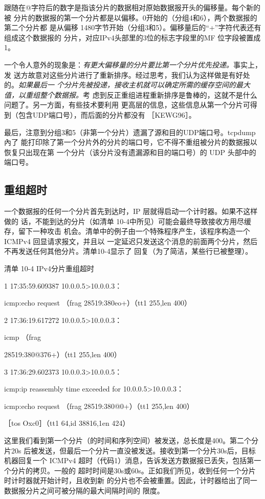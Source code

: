 跟随在@字符后的数字是指该分片的数据相对原始数据报开头的偏移量。每个新的被
分片的数据报的第一个分片都是以偏移。0开始的（分组4和6），两个数据报的第二个分片都
是从偏移 1480字节开始（分组3和5）。偏移量后的“+”字符代表还有组成这个数据报的
分片，对应IPv4头部里的3位的标志字段里的MF 位字段被置成1。

一个令人意外的现象是：\emph{有更大偏移量的分片要比第一个分片优先投递。}事实上，发
送方故意对这些分片进行了重新排序。经过思考，我们认为这样做是有好处的。\emph{如果最后一
个分片先被投递，接收主机就可以确定所需的缓存空间的最大值，以重组整个数据报。}考
虑到反正重组进程重新排序是鲁棒的，这就不是什么问题了。另一方面，有些技术要利用
更高层的信息，这些信息从第一个分片可得到（包含UDP端口号），而后面的分片都没有
［KEWG96］。

最后，注意到分组3和5（非第一个分片）遗漏了源和目的UDP端口号。tcpdump 內了
能打印除了第一个分片外的分片的端口号，它不得不重组被分片的数据报以恢复只出现在第
一个分片（该分片没有遗漏源和目的端口号）的 UDP 头部中的端口号。

\subsection{重组超时}
一个数据报的任何一个分片首先到达时，IP 层就得启动一个计时器。如果不这样做的
话，不能到达的分片（如清单 10-4中所见）可能会最终导致接收方用尽缓存，留下一种攻击
机会。清单中的例子由一个特殊程序产生，该程序构造一个ICMPv4 回显请求报文，并且以
一定延迟只发送这个消息的前面两个分片，然后不再发送任何其他分片。清单10-4显示了
回复（为了简洁，某些行已被整理）。

清单 10-4 IPv4分片重组超时

1 17:35:59.609387 10.0.0.5>10.0.0.3：

icmp:echo request （frag 28519:380eo+）（tt1 255,len 400）

2 17:36:19.617272 10.0.0.5>10.0.0.3：

icmp （frag

28519:380@376+）（tt1 255,len 400）

3 17:36:29.602373 10.0.0.3>10.0.0.5：

icmp:ip reassembly time exceeded for 10.0.0.5>10.0.0.3：

icmp:echo request （frag 28519:380@0+）（tt1 255,len 400）

［tos Oxc0］（tt1 64,id 38816,1en 424）

这里我们看到第一个分片（的时间和序列空间）被发送，总长度是400。第二个分片20s
后被发送，但最后一个分片一直没被发送。接收到第一个分片30s后，目标机器回复一个
ICMPv4 超时（代码1）消息，告诉发送方数据报已丢失，包括第一个分片的拷贝。一般的
超时时间是30s或60s。正如我们所见，收到任何一个分片时计时器就开始计时，且收到新
的分片也不会被重置。因此，计时器给出了同一数据报分片之间可被分隔的最大间隔时间的
限度。


